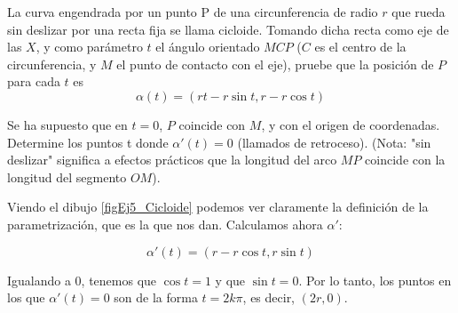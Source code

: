 \begin{problem}[5]
La curva engendrada por un punto P de una circunferencia de radio $r$ que rueda sin deslizar por una recta fija se llama cicloide. Tomando dicha recta como eje de las $X$, y como parámetro $t$ el ángulo orientado $MCP$ ($C$ es el centro de la circunferencia, y $M$ el punto de contacto con el eje), pruebe que la posición de $P$ para cada $t$ es
\[ α(t) = (rt − r \sin t, r − r \cos t) \]

Se ha supuesto que en $t = 0$, $P$ coincide con $M$, y con el origen de coordenadas. Determine los puntos t donde $α′(t) = 0$ (llamados de retroceso). (Nota: "sin deslizar" significa a efectos prácticos que la longitud del arco $MP$ coincide con la longitud del segmento $OM$).

\solution


Viendo el dibujo \ref{figEj5_Cicloide} podemos ver claramente la definición de la parametrización, que es la que nos dan. Calculamos ahora $α'$:

\[ α'(t) = (r-r\cos t, r\sin t) \]

Igualando a 0, tenemos que $\cos t = 1$ y que $\sin t = 0$. Por lo tanto, los puntos en los que $α'(t)=0$ son de la forma $t=2kπ$, es decir, $(2r,0)$.


\end{problem}

